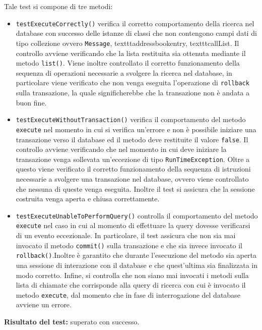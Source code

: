 \begin{itemize}
Tale test si compone di tre metodi:
\begin{itemize}
\item \texttt{testExecuteCorrectly()} verifica il corretto comportamento della ricerca nel database con successo delle istanze di classi che non contengono campi dati di tipo collezione ovvero \texttt{Message}, texttt{addressbookentry}, texttt{callList}.  
Il controllo avviene verificando che la lista restituita sia ottenuta mediante il metodo \texttt{list()}. 
Viene inoltre controllato il corretto funzionamento della sequenza di operazioni necessarie a svolgere la ricerca nel database, in particolare viene verificato che non venga eseguita l'operazione di \texttt{rollback} sulla transazione, la quale significherebbe che la transazione non è andata a buon fine.

\item \texttt{testExecuteWithoutTransaction()} verifica il comportamento del metodo \\ \texttt{execute} nel momento in cui si verifica un'errore e non è possibile iniziare una transazione verso il database ed il metodo deve restituite il valore \texttt{false}. Il controllo avviene verificando che nel momento in cui deve iniziare la transazione venga sollevata un'eccezione di tipo \texttt{RunTimeException}. Oltre a questo viene verificato il corretto funzionamento della sequenza di istruzioni necessarie a svolgere una transazione nel database, ovvero viene controllato che nessuna di queste venga eseguita. Inoltre il test si assicura che la sessione costruita venga aperta e chiusa correttamente.

\item \texttt{testExecuteUnableToPerformQuery()} controlla il comportamento del metodo \\ \texttt{execute} nel caso in cui al momento di effettuare la query dovesse verificarsi di un evento eccezionale. In particolare, il test assicura che non sia mai invocato il metodo \texttt{commit()} sulla transazione e che sia invece invocato il \texttt{rollback()}.Inoltre è garantito che durante l'esecuzione del metodo sia aperta una sessione di interazione con il database e che quest'ultima sia finalizzata in modo corretto. Infine, si controlla che non siano mai invocati i metodi sulla lista di chiamate che corrisponde alla query di ricerca con cui è invocato il metodo \texttt{execute}, dal momento che in fase di interrogazione del database avviene un errore.

\end{itemize}
\textbf{Risultato del test:} superato con successo.



\end{itemize}
